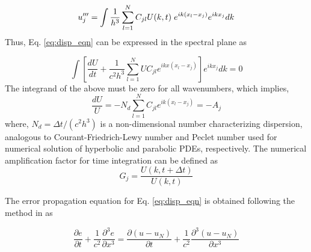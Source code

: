 \documentclass{svjour3}                    %
\begin{document}
\begin{equation} \label{3rd_der_num}
u'''_j = \int \frac{1}{h^3} \sum_{l=1}^N C_{jl} U(k,t) \hspace{1mm} e^{i k (x_l-x_j)} e^{i k x_j} dk
\end{equation}
Thus, Eq. \eqref{eq:disp_eqn} can be expressed in the spectral plane as 

\begin{equation}
\int \left[ \frac {d U}{d t} + \frac {1}{c^2h^3} \sum_{l=1}^N U C_{jl}
     e^{i k x(x_l-x_j)} \right] e^{i k x_j} dk = 0
\end{equation}
The integrand of the above must be zero for all wavenumbers, which implies,
\begin{equation}
\frac{dU}{U} = - N_d \sum \limits_{l=1}^{N} C_{jl} e^{i k (x_l-x_j)} = -A_j
\end{equation}
where, $N_d = \Delta t/(c^2h^3)$ is a non-dimensional number characterizing dispersion, analogous to Courant-Friedrich-Lewy number and Peclet number used for numerical solution of hyperbolic and parabolic PDEs, respectively. The numerical amplification factor for time integration can be defined as
\begin{equation*}
G_j = \frac{U(k,t + \Delta t)}{U(k,t)} 
\end{equation*}

The error propagation equation for Eq. \eqref{eq:disp_eqn} is obtained following the method in \cite{Sengupta2007} as 

\begin{equation} 
\label{eq:epe1}
\frac{\partial e}{\partial t} + \frac{1}{c^2} \frac{\partial^3 e}{\partial x^3} =\frac{\partial (u-u_N)}{\partial t} + \frac{1}{c^2} \frac{\partial^3 (u-u_N)}{\partial x^3} 
\end{equation}
\end{document}
